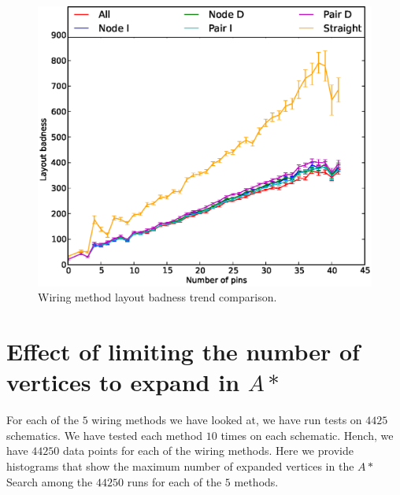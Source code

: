 \begin{figure}[H]
\begin{center}
\includegraphics[width=\textwidth]{Images/wiring_badness_trend_comparison.eps}
\caption[Wiring method layout badness trend comparison]{Wiring method layout
badness trend comparison.}
\label{fig:wiring_badness_trend}
\end{center}
\end{figure}

\section{Effect of limiting the number of vertices to expand in $A*$}
\label{sec:expand_limit}

For each of the $5$ wiring methods we have looked at, we have run tests on $4425$
schematics. We have tested each method $10$ times on each schematic. Hench, we
have $44250$ data points for each of the wiring methods. Here we provide
histograms that show the maximum number of expanded vertices in the $A*$ Search
among the $44250$ runs for each of the $5$ methods.

